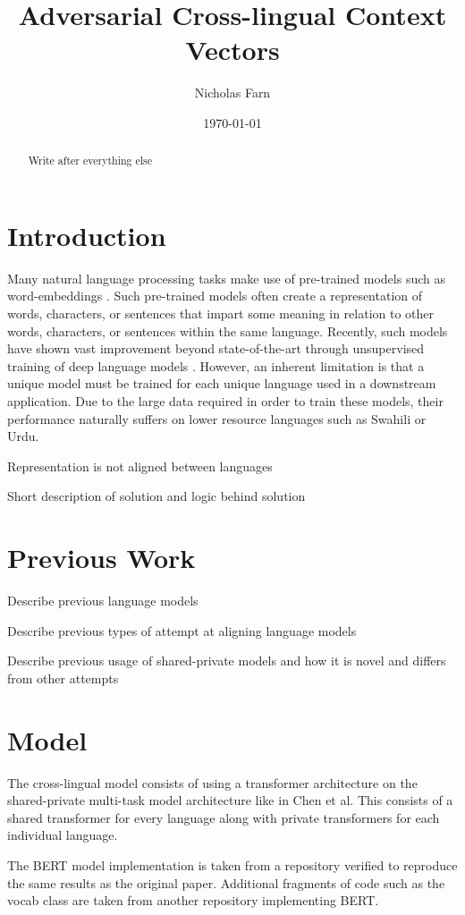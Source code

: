 \documentclass[12pt,letterpaper]{article}
\title{Adversarial Cross-lingual Context Vectors}
\author{Nicholas Farn}
\date{\today}
\begin{document}
\maketitle
\begin{abstract}
Write after everything else
\end{abstract}

\begin{multicols}{2}
\section{Introduction}
Many natural language processing tasks make use of pre-trained models such as word-embeddings \cite{}.  Such pre-trained models often create a representation of words, characters, or sentences that impart some meaning in relation to other words, characters, or sentences within the same language.  Recently, such models have shown vast improvement beyond state-of-the-art through unsupervised training of deep language models \cite{BERT, OpenAI, ELMo}.  However, an inherent limitation is that a unique model must be trained for each unique language used in a downstream application.  Due to the large data required in order to train these models, their performance naturally suffers on lower resource languages such as Swahili or Urdu.  

Representation is not aligned between languages

Short description of solution and logic behind solution

\section{Previous Work}
Describe previous language models

Describe previous types of attempt at aligning language models

Describe previous usage of shared-private models and how it is novel and differs
from other attempts

\section{Model}
The cross-lingual model consists of using a transformer architecture on the shared-private multi-task model architecture like in Chen et al.  This consists of a shared transformer for every language along with private transformers for each individual language.

The BERT model implementation is taken from a repository verified to reproduce the same results as the original paper.  Additional fragments of code such as the vocab class are taken from another repository implementing BERT.


\end{multicols}
\end{document}
